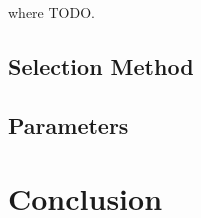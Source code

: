 \documentclass{article}
\begin{document}
where TODO.

\subsection{Selection Method}

\subsection{Parameters}

\section{Conclusion}




\end{document}
